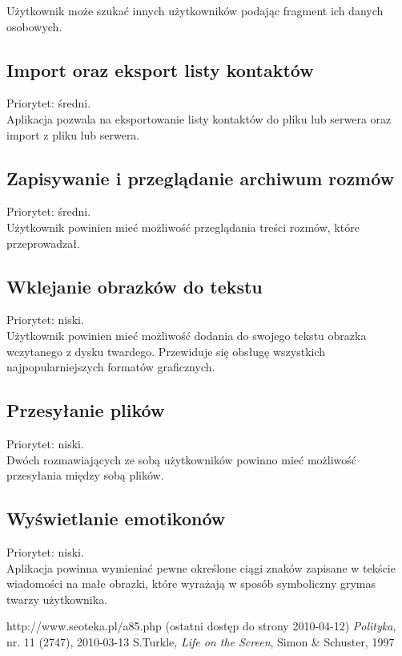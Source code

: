 \documentclass[a4paper,12pt]{article}
\begin{document}
Użytkownik może szukać innych użytkowników podając fragment ich danych osobowych.
\subsection[Import oraz eksport listy kontaktów]{Import oraz eksport listy kontaktów}

Priorytet: średni.\\

Aplikacja pozwala na eksportowanie listy kontaktów do pliku lub serwera oraz import z pliku lub serwera.
\subsection[Zapisywanie i przeglądanie archiwum rozmów]{Zapisywanie i przeglądanie archiwum rozmów}
Priorytet: średni.\\

Użytkownik powinien mieć możliwość przeglądania treści rozmów, które przeprowadzał.

\subsection[Wklejanie obrazków do tekstu]{Wklejanie obrazków do tekstu}

Priorytet: niski.\\

Użytkownik powinien mieć możliwość dodania do swojego tekstu obrazka wczytanego z dysku twardego.
Przewiduje się obsługę wszystkich najpopularniejszych formatów graficznych.
\subsection[Przesyłanie plików]{Przesyłanie plików}

Priorytet: niski.\\

Dwóch rozmawiających ze sobą użytkowników powinno mieć możliwość przesyłania między sobą plików.
\subsection[Wyświetlanie emotikonów]{Wyświetlanie emotikonów}

Priorytet: niski.\\

Aplikacja powinna wymieniać pewne określone ciągi znaków zapisane w tekście wiadomości na małe obrazki, które
wyrażają w sposób symboliczny grymas twarzy użytkownika.


\begin{thebibliography}{9}
 http://www.seoteka.pl/a85.php (ostatni dostęp do strony 2010-04-12)
 \emph{Polityka}, nr. 11 (2747), 2010-03-13
 S.Turkle, \emph{Life on the Screen}, Simon \& Schuster, 1997
\end{thebibliography}
\end{document}
